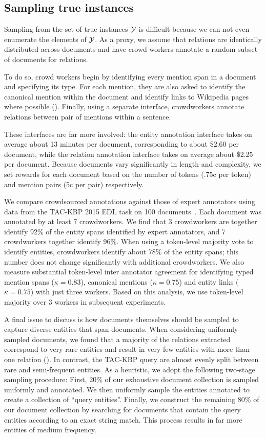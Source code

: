 \subsection{Sampling true instances}
Sampling from the set of true instances $\mathcal{Y}$ is difficult because we can not even enumerate the elements of $\mathcal{Y}$.
As a proxy, we assume that relations are identically distributed across documents and have crowd workers annotate a random subset of documents for relations.

To do so, crowd workers begin by identifying every mention span in a document and specifying its type.
  For each mention, they are also asked to identify the canonical mention within the document
  and identify links to Wikipedia pages where possible ().
Finally, using a separate interface, crowdworkers annotate relations between pair of mentions within a sentence.

These interfaces are far more involved: the entity annotation interface takes on average about 13 minutes per document, corresponding to about \$2.60 per document, while the relation annotation interface takes on average about \$2.25 per document.
Because documents vary significantly in length and complexity, we set rewards for each document based on the number of tokens (.75c per token) and mention pairs (5c per pair) respectively.

We compare crowdsourced annotations against those of expert annotators using data from the TAC-KBP 2015 EDL task on 100 documents~\citep{}.
Each document was annotated by at least 7 crowdworkers.
We find that 3 crowdworkers are together identify 92\% of the entity spans identified by expert annotators,
  and 7 crowdworkers together identify 96\%.
When using a token-level majority vote to identify entities, crowdworkers identify about 78\% of the entity spans; this number does not change significantly with additional crowdworkers.
We also measure substantial token-level inter annotator agreement for identifying typed mention spans ($\kappa = 0.83$), canonical mentions ($\kappa = 0.75$) and entity links ($\kappa = 0.75$) with just three workers.
Based on this analysis, we use token-level majority over 3 workers in subsequent experiments.

A final issue to discuss is how documents themselves should be sampled to capture diverse entities that span documents.
When considering uniformly sampled documents, we found that a majority of the relations extracted correspond to very rare entities and result in very few entities with more than one relation ().
In contrast, the TAC-KBP query are almost evenly split between rare and semi-frequent entities.
As a heuristic, we adopt the following two-stage sampling procedure:
First, 20\% of our exhaustive document collection is sampled uniformly and annotated.
We then uniformly sample the entities annotated to create a collection of ``query entities''.
Finally, we construct the remaining 80\% of our document collection by searching for documents that contain the query entities according to an exact string match. This process results in far more entities of medium frequency.
